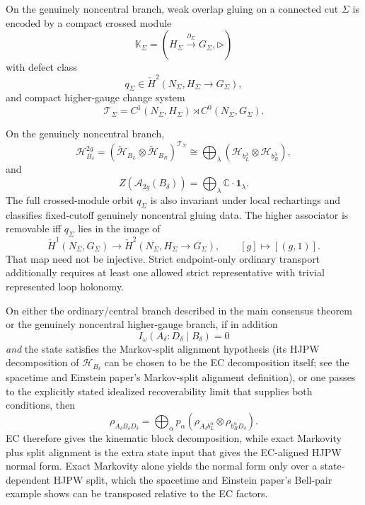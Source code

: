\begin{proposition}
On the genuinely noncentral branch, weak overlap gluing on a connected cut \(\Sigma\) is encoded
by a compact crossed module
\[
\mathbb K_\Sigma=(H_\Sigma\xrightarrow{\partial_\Sigma}G_\Sigma,\triangleright)
\]
with defect class
\[
q_\Sigma\in \check H^2(N_\Sigma,H_\Sigma\to G_\Sigma),
\]
and compact higher-gauge change system
\[
\mathcal T_\Sigma=C^1(N_\Sigma,H_\Sigma)\rtimes C^0(N_\Sigma,G_\Sigma).
\]
\end{proposition}

\begin{theorem}
On the genuinely noncentral branch,
\[
\mathcal H_{B_\delta}^{2g}
=
(\tilde{\mathcal H}_{B_L}\otimes \tilde{\mathcal H}_{B_R})^{\mathcal T_\Sigma}
\cong
\bigoplus_\lambda
(\mathcal H_{b_L^\lambda}\otimes \mathcal H_{b_R^\lambda}),
\]
and
\[
Z(\mathcal A_{2g}(B_\delta))
=
\bigoplus_\lambda \mathbb C\cdot \mathbf 1_\lambda.
\]
The full crossed-module orbit \(q_\Sigma\) is also invariant under local rechartings and
classifies fixed-cutoff genuinely noncentral gluing data. The higher associator is removable iff
\(q_\Sigma\) lies in the image of
\[
\check H^1(N_\Sigma,G_\Sigma)\longrightarrow
\check H^2(N_\Sigma,H_\Sigma\to G_\Sigma),
\qquad [g]\longmapsto[(g,1)].
\]
That map need not be injective. Strict endpoint-only ordinary transport additionally requires at
least one allowed strict representative with trivial represented loop holonomy.
\end{theorem}

\begin{corollary}
On either the ordinary/central branch described in the main consensus theorem or the genuinely noncentral
higher-gauge branch, if in addition
\[
I_\omega(A_\delta:D_\delta\mid B_\delta)=0
\]
\emph{and} the state satisfies the Markov-split alignment hypothesis (its HJPW decomposition of
\(\mathcal H_{B_\delta}\) can be chosen to be the EC decomposition itself; see the spacetime and Einstein paper's
Markov-split alignment definition), or one passes to the explicitly stated
idealized recoverability limit that supplies both conditions, then
\[
\rho_{A_\delta B_\delta D_\delta}
=
\bigoplus_\alpha p_\alpha
\left(\rho_{A_\delta b_L^\alpha}\otimes \rho_{b_R^\alpha D_\delta}\right).
\]
EC therefore gives the kinematic block decomposition, while exact Markovity plus split alignment
is the extra state input that gives the EC-aligned HJPW normal form. Exact Markovity alone yields
the normal form only over a state-dependent HJPW split, which the spacetime and Einstein paper's
Bell-pair example shows can be transposed relative to the EC factors.
\end{corollary}

